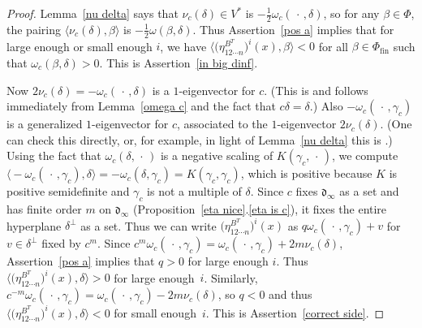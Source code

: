 \documentclass{amsart}
\theoremstyle{definition}
\theoremstyle{remark}
\numberwithin{equation}{section}
\newcommand{\br}[1]{{\langle #1 \rangle}}
\newcommand{\brr}[1]{{\bigl\langle #1 \bigr\rangle}}
\newcommand{\0}{{\mathbf{0}}}
\renewcommand{\d}{{\mathfrak d}}
\newcommand{\fin}{\mathrm{fin}}
\newcommand{\RSChar}{\Phi}
\newcommand{\RS}{\RSChar}
\newcommand{\RSfin}{\RS_\fin}
\begin{document}
\begin{proof}
Lemma~\ref{nu delta} says that $\nu_c(\delta)\in V^*$ is $-\frac12\omega_c(\,\cdot\,,\delta)$, so for any $\beta\in\RS$, the pairing $\br{\nu_c(\delta),\beta}$ is $-\frac12\omega(\beta,\delta)$.
Thus Assertion~\ref{pos a} implies that for large enough or small enough $i$, we have $\brr{\bigl(\eta_{12\cdots n}^{B^T}\bigr)^i(x),\beta}<0$ for all $\beta\in\RSfin$ such that $\omega_c(\beta,\delta)>0$.
This is Assertion~\ref{in big dinf}.  

Now $2\nu_c(\delta)=-\omega_c(\,\cdot\,,\delta)$ is a $1$-eigenvector for $c$.
(This is \cite[Lemma~3.5]{afforb} and follows immediately from Lemma~\ref{omega c} and the fact that $c\delta=\delta$.)
Also $-\omega_c(\,\cdot\,,\gamma_c)$ is a generalized $1$-eigenvector for $c$, associated to the $1$-eigenvector $2\nu_c(\delta)$.
(One can check this directly, or, for example, in light of Lemma~\ref{nu delta} this is \cite[Lemma~2.8]{affncA}.)
Using the fact \cite[Lemma~3.5]{afforb} that $\omega_c(\delta,\,\cdot\,)$ is a negative scaling of $K(\gamma_c,\,\cdot\,)$, we compute $\brr{-\omega_c(\,\cdot\,,\gamma_c),\delta}=-\omega_c(\delta,\gamma_c)=K(\gamma_c,\gamma_c)$, which is positive because $K$ is positive semidefinite and $\gamma_c$ is not a multiple of $\delta$.
Since $c$ fixes $\d_\infty$ as a set and has finite order $m$ on $\d_\infty$ (Proposition~\ref{eta nice}.\ref{eta is c}), it fixes the entire hyperplane $\delta^\perp$ as a set.
Thus we can write $\bigl(\eta_{12\cdots n}^{B^T}\bigr)^i(x)$ as $q\omega_c(\,\cdot\,,\gamma_c)+v$ for $v\in\delta^\perp$ fixed by $c^m$.
Since $c^m\omega_c(\,\cdot\,,\gamma_c)=\omega_c(\,\cdot\,,\gamma_c)+2m\nu_c(\delta)$, Assertion~\ref{pos a} implies that $q>0$ for large enough $i$.
Thus $\brr{\bigl(\eta_{12\cdots n}^{B^T}\bigr)^i(x),\delta}>0$ for large enough~$i$.
  Similarly, $c^{-m}\omega_c(\,\cdot\,,\gamma_c)=\omega_c(\,\cdot\,,\gamma_c)-2m\nu_c(\delta)$, so $q<0$ and thus $\brr{\bigl(\eta_{12\cdots n}^{B^T}\bigr)^i(x),\delta}<0$ for small enough~$i$.
This is Assertion~\ref{correct side}.
\end{proof}
\end{document}
